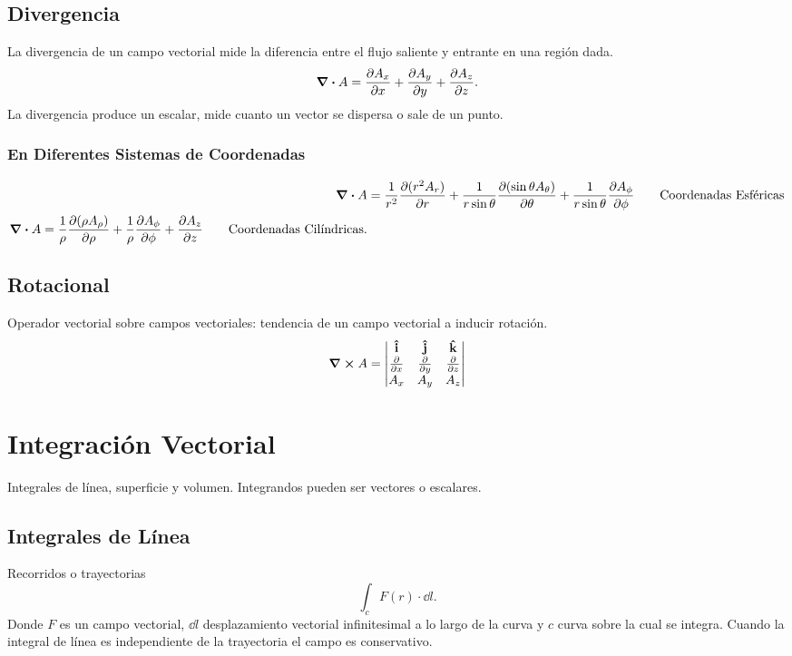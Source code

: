 \subsection{Divergencia}
La divergencia de un campo vectorial mide la diferencia entre el flujo saliente y entrante en una región dada.
\begin{equation}
	\div{A} = \pdv{A_x}{x} + \pdv{A_y}{y} + \pdv{A_z}{z}.
\end{equation}
La divergencia produce un escalar, mide cuanto un vector se dispersa o sale de un punto.
\subsubsection{En Diferentes Sistemas de Coordenadas}
\begin{align*}
	\div{A} &= \frac{1}{r^2} \pdv{(r^2 A_r)}{r} + \frac{1}{r\sin{\theta}} \pdv{(\sin{\theta} A_\theta)}{\theta} + \frac{1}{r\sin{\theta}} \pdv{A_\phi}{\phi} \qquad \text{Coordenadas Esféricas} \\
	\div{A} = \frac{1}{\rho} \pdv{(\rho A_\rho)}{\rho} + \frac{1}{\rho} \pdv{A_\phi}{\phi} + \pdv{A_z}{z} \qquad \text{Coordenadas Cilíndricas.}
\end{align*}








\subsection{Rotacional}
Operador vectorial sobre campos vectoriales: tendencia de un campo vectorial a inducir rotación.
\begin{equation}
	\curl{A} = \mqty| \vi & \vj & \vk \\ \pdv{x} & \pdv{y} & \pdv{z} \\ A_x & A_y & A_z |
\end{equation}


\section{Integración Vectorial}
Integrales de línea, superficie y volumen. Integrandos pueden ser vectores o escalares. \\
\subsection{Integrales de Línea}
Recorridos o trayectorias
\begin{equation}
	\int _c F(r) \cdot \dd{l}.
\end{equation}
Donde $F$ es un campo vectorial, $\dd{l}$ desplazamiento vectorial infinitesimal a lo largo de la curva y $c$ curva sobre la cual se integra. Cuando la integral de línea es independiente de la trayectoria el campo es conservativo.

